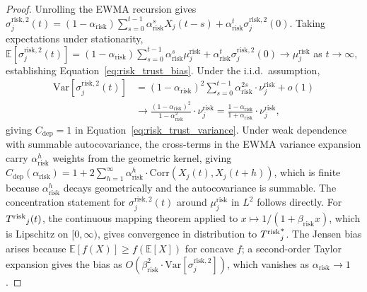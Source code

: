 \begin{proof}
Unrolling the EWMA recursion gives
$\sigma_j^{\mathrm{risk},2}(t) = (1 - \alpha_{\mathrm{risk}})
    \sum_{s=0}^{t-1} \alpha_{\mathrm{risk}}^s X_j(t-s)
    + \alpha_{\mathrm{risk}}^t \sigma_j^{\mathrm{risk},2}(0)$.
Taking expectations under stationarity,
$\mathbb{E}[\sigma_j^{\mathrm{risk},2}(t)]
    = (1 - \alpha_{\mathrm{risk}})
      \sum_{s=0}^{t-1} \alpha_{\mathrm{risk}}^s \mu_j^{\mathrm{risk}}
    + \alpha_{\mathrm{risk}}^t \sigma_j^{\mathrm{risk},2}(0)
    \to \mu_j^{\mathrm{risk}}$ as $t \to \infty$, establishing
    Equation~\eqref{eq:risk_trust_bias}. Under the i.i.d.\ assumption,
\begin{align*}
\mathrm{Var}[\sigma_j^{\mathrm{risk},2}(t)]
    &= (1 - \alpha_{\mathrm{risk}})^2
       \sum_{s=0}^{t-1} \alpha_{\mathrm{risk}}^{2s}
       \cdot \nu_j^{\mathrm{risk}}
       + o(1) \\
    &\longrightarrow \frac{(1 - \alpha_{\mathrm{risk}})^2}
                          {1 - \alpha_{\mathrm{risk}}^2}
       \cdot \nu_j^{\mathrm{risk}}
       = \frac{1 - \alpha_{\mathrm{risk}}}
              {1 + \alpha_{\mathrm{risk}}}
       \cdot \nu_j^{\mathrm{risk}},
\end{align*}
giving $C_{\mathrm{dep}} = 1$ in
Equation~\eqref{eq:risk_trust_variance}. Under weak dependence
with summable autocovariance, the cross-terms in the EWMA variance
expansion carry $\alpha_{\mathrm{risk}}^h$ weights from the
geometric kernel, giving
$C_{\mathrm{dep}}(\alpha_{\mathrm{risk}}) = 1 + 2
\sum_{h=1}^{\infty} \alpha_{\mathrm{risk}}^h \cdot
\mathrm{Corr}(X_j(t), X_j(t+h))$, which is finite because
$\alpha_{\mathrm{risk}}^h$ decays geometrically and the
autocovariance is summable. The
concentration statement for $\sigma_j^{\mathrm{risk},2}(t)$ around
$\mu_j^{\mathrm{risk}}$ in $L^2$ follows directly. For ${T^{\mathrm{risk}}}_j(t)$,
the continuous mapping theorem applied to
$x \mapsto 1 / (1 + \beta_{\mathrm{risk}} x)$, which is Lipschitz on
$[0, \infty)$, gives convergence in distribution to
${T^{\mathrm{risk}}}_j^*$. The Jensen bias arises because
$\mathbb{E}[f(X)] \geq f(\mathbb{E}[X])$ for concave $f$; a
second-order Taylor expansion gives the bias as
$O(\beta_{\mathrm{risk}}^2 \cdot
\mathrm{Var}[\sigma_j^{\mathrm{risk},2}])$, which vanishes as
$\alpha_{\mathrm{risk}} \to 1$.
\end{proof}

